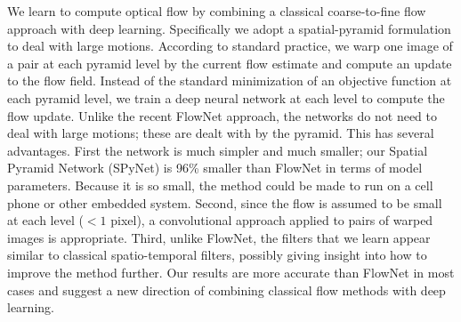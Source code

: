We learn to compute optical flow by combining a classical coarse-to-fine flow approach with deep learning.
Specifically we adopt a spatial-pyramid formulation to deal with large motions.
According to standard practice, we warp one image of a pair at each pyramid level by the current flow estimate and compute an update to the flow field.
Instead of the standard minimization of an objective function at each pyramid level, we train a deep neural network at each level to compute the flow update.
Unlike the recent FlowNet approach, the networks do not need to deal with large motions; these are dealt with by the pyramid.  
This has several advantages. First the network is much simpler and much smaller; our Spatial Pyramid Network (SPyNet) is 96\% smaller than FlowNet in terms of model parameters.
Because it is so small, the method could be made to run on a cell phone or other embedded system.
Second, since the flow is assumed to be small at each level ($< 1$ pixel), a convolutional approach applied to pairs of warped images is appropriate.
Third, unlike FlowNet, the filters that we learn appear similar to classical spatio-temporal filters, possibly giving insight into how to improve the method further.
Our results are more accurate than FlowNet in most cases and suggest a new direction of combining classical flow methods with deep learning. 
